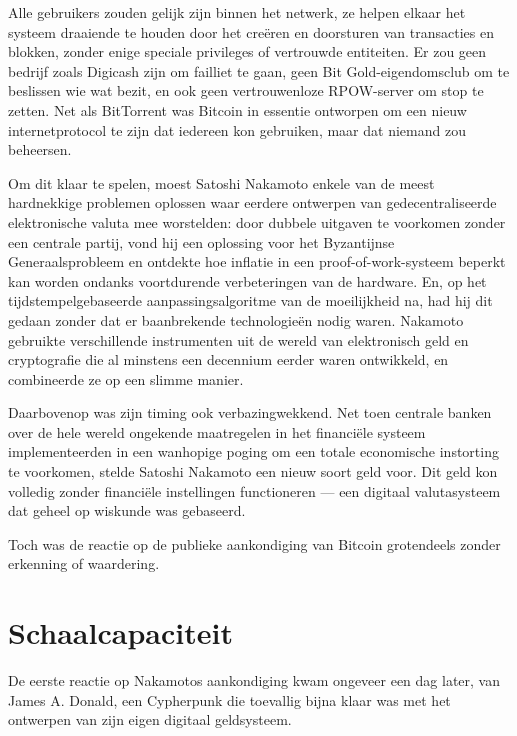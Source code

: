 \documentclass[
  a5paper,
  smalldemyvopaper,11pt,twoside,onecolumn,openright,extrafontsizes,
hidelinks]{memoir}
\begin{document}
Alle gebruikers zouden gelijk zijn binnen het netwerk, ze helpen elkaar
het systeem draaiende te houden door het creëren en doorsturen van
transacties en blokken, zonder enige speciale privileges of vertrouwde
entiteiten. Er zou geen bedrijf zoals Digicash zijn om failliet te gaan,
geen Bit Gold-eigendomsclub om te beslissen wie wat bezit, en ook geen
vertrouwenloze RPOW-server om stop te zetten. Net als BitTorrent was
Bitcoin in essentie ontworpen om een nieuw internetprotocol te zijn dat
iedereen kon gebruiken, maar dat niemand zou beheersen.

Om dit klaar te spelen, moest Satoshi Nakamoto enkele van de meest
hardnekkige problemen oplossen waar eerdere ontwerpen van
gedecentraliseerde elektronische valuta mee worstelden: door dubbele
uitgaven te voorkomen zonder een centrale partij, vond hij een oplossing
voor het Byzantijnse Generaalsprobleem en ontdekte hoe inflatie in een
proof-of-work-systeem beperkt kan worden ondanks voortdurende
verbeteringen van de hardware. En, op het tijdstempelgebaseerde
aanpassingsalgoritme van de moeilijkheid na, had hij dit gedaan zonder
dat er baanbrekende technologieën nodig waren. Nakamoto gebruikte
verschillende instrumenten uit de wereld van elektronisch geld en
cryptografie die al minstens een decennium eerder waren ontwikkeld, en
combineerde ze op een slimme manier.

Daarbovenop was zijn timing ook verbazingwekkend. Net toen centrale
banken over de hele wereld ongekende maatregelen in het financiële
systeem implementeerden in een wanhopige poging om een totale
economische instorting te voorkomen, stelde Satoshi Nakamoto een nieuw
soort geld voor. Dit geld kon volledig zonder financiële instellingen
functioneren --- een digitaal valutasysteem dat geheel op wiskunde was
gebaseerd.

Toch was de reactie op de publieke aankondiging van Bitcoin grotendeels
zonder erkenning of waardering.

\section{\texorpdfstring{\textbf{Schaalcapaciteit}}{Schaalcapaciteit}}\label{schaalcapaciteit}

De eerste reactie op Nakamotos aankondiging kwam ongeveer een dag later,
van James A. Donald, een Cypherpunk die toevallig bijna klaar was met
het ontwerpen van zijn eigen digitaal geldsysteem.
\end{document}

